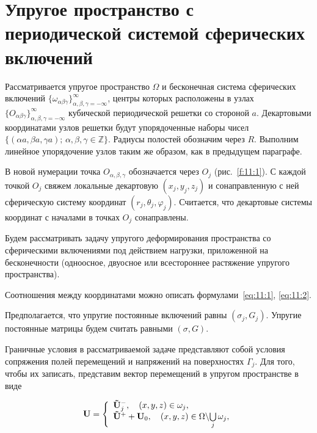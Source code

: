 \section[Упругое пространство с периодической системой сферических включений]{Упругое пространство с периодической системой сферических включений}

Рассматривается упругое пространство $\Omega$ и бесконечная система сферических включений $\{\omega_{\alpha\beta\gamma}\}_{\alpha,\beta,\gamma=-\infty}^\infty$, центры которых расположены в узлах $\{O_{\alpha\beta\gamma}\}_{\alpha,\beta,\gamma=-\infty}^\infty$ кубической периодической решетки со стороной $a$. Декартовыми координатами узлов решетки будут упорядоченные наборы чисел $\{(\alpha a,\beta a,\gamma a);\,\alpha,\beta,\gamma\in\mathbb{Z}\}$. Радиусы полостей обозначим через $R$. Выполним линейное упорядочение узлов таким же образом, как в предыдущем параграфе.\sloppy

В новой нумерации точка $O_{\alpha,\beta,\gamma}$ обозначается через $O_j$ (рис.~\ref{f:11:1}). С каждой точкой $O_j$ свяжем локальные декартовую $(x_j,y_j,z_j)$ и сонаправленную с ней сферическую систему координат $(r_j,\theta_j,\varphi_j)$. Считается, что декартовые системы координат с началами в точках $O_j$ сонаправлены.

Будем рассматривать задачу упругого деформирования пространства со сферическими включениями под действием нагрузки, приложенной на бесконечности (одноосное, двуосное или всестороннее растяжение упругого пространства).

Соотношения между координатами можно описать формулами~\eqref{eq:11:1}, \eqref{eq:11:2}.

Предполагается, что упругие постоянные включений равны $(\sigma_j,G_j)$. Упругие постоянные матрицы будем считать равными $(\sigma,G)$.

Граничные условия в рассматриваемой задаче представляют собой условия сопряжения полей перемещений и напряжений на поверхностях $\Gamma_j$. Для того, чтобы их записать, представим вектор перемещений в упругом пространстве в виде

\begin{equation}
{\bf{U}} = \left\{ {\begin{array}{*{20}{l}}
{{\bf{\tilde U}}_j^ - ,\quad \left( {x,y,z} \right) \in \omega_j,}\\
{{{{\bf{\tilde U}}}^ + } + {{\bf{U}}_0},\quad \left( {x,y,z} \right) \in\Omega\backslash {\bigcup\limits_j\omega_j},}
\end{array}} \right.
\label{eq:11:23}
\end{equation}

